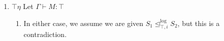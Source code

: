\documentclass[acmsmall,screen,12pt]{acmart}
\newcommand{\apreorder}{\trianglelefteq}
\newcommand{\ix}[2]{\mathrel{#1^{#2}}}
\newcommand{\itylrof}[3]{\ilrof{#1}{#3,#2}}
\newcommand{\ilrof}[2]{\mathrel{{#1}^{\text{log}}_{#2}}}
\newcommand{\itylr}[2]{\itylrof{\apreorder}{#1}{#2}}
\newcommand{\result}{\text{result}}
\begin{document}
{\begin{longproof}
\begin{enumerate}
\begin{enumerate}
\begin{align*}
      \end{align*}
      So by anti-reduction it is sufficient to show
      \[ S_1[M[\gamma_1]] \ix\apreorder i \result(S_2[M[\gamma_2]]) \]
      which follows by reflexivity, assumption.
    \item Opposite case is similar.
    \end{enumerate}
  \item $\top\eta$ Let $\Gamma \vdash M : \top$
    \begin{enumerate}
    \item In either case, we assume we are given $S_1 \itylr i \top
      S_2$, but this is a contradiction.
    \end{enumerate}
  \end{enumerate}
\end{longproof}

}
\end{document}
